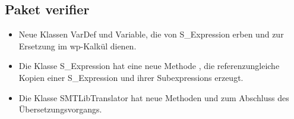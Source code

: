 \subsection{Paket verifier}
\begin{itemize}
  \item Neue Klassen VarDef und Variable, die von S\_Expression erben und zur Ersetzung im wp-Kalk\"{u}l dienen.
  \item Die Klasse S\_Expression hat eine neue Methode , die referenzungleiche Kopien einer S\_Expression und ihrer Subexpressions erzeugt.
  \item Die Klasse SMTLibTranslator hat neue Methoden  und  zum Abschluss des \"{U}bersetzungsvorgangs.
\end{itemize}


